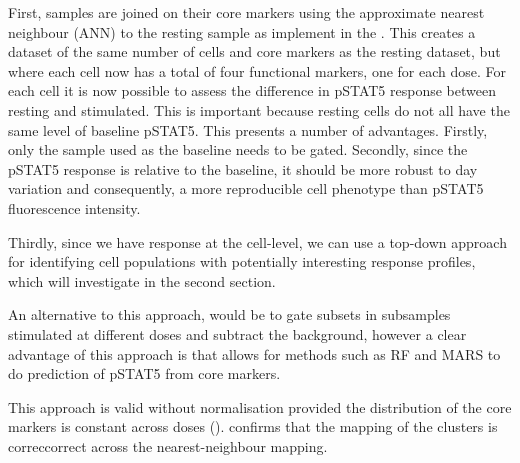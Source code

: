 First, samples are joined on their core markers using the approximate nearest neighbour (ANN) to the resting sample \citep{Jones:2011ez}
as implement in the .
This creates a dataset of the same number of cells and core markers as the resting dataset, but where each cell now has a total of four functional markers,
one for each dose.
For each cell it is now possible to assess the difference in pSTAT5 response between resting and stimulated.
This is important because resting cells do not all have the same level of baseline pSTAT5.
This presents a number of advantages.
Firstly, only the sample used as the baseline needs to be gated.
Secondly, since the pSTAT5 response is relative to the baseline, it should be more robust to day variation and consequently,
a more reproducible cell phenotype than pSTAT5 fluorescence intensity.

Thirdly, since we have response at the cell-level, we can use a top-down approach for identifying cell populations with potentially interesting response profiles,
which will investigate in the second section.

An alternative to this approach, would be to gate subsets in subsamples stimulated at different doses and subtract the background,
however a clear advantage of this approach is that allows for methods such as RF and MARS to do prediction of pSTAT5 from core markers.

This approach is valid without normalisation provided the distribution of the core markers is constant across doses ().
 confirms that the mapping of the clusters is correccorrect across the nearest-neighbour mapping.


